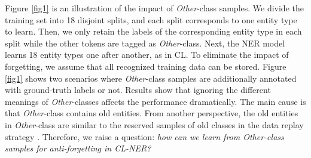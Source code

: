 \documentclass[11pt]{article}
\begin{document}
Figure \ref{fig1} is an illustration of the impact of \textit{Other}-class samples.
We divide the training set into 18 disjoint splits, and each split corresponds to one entity type to learn.
Then, we only retain the labels of the corresponding entity type in each split while the other tokens are tagged as \textit{Other}-class.
Next, the NER model learns 18 entity types one after another, as in CL.
To eliminate the impact of forgetting, we assume that all recognized training data can be stored.
Figure \ref{fig1} shows two scenarios where \textit{Other}-class samples are additionally annotated with ground-truth labels or not.
Results show that ignoring the different meanings of \textit{Other}-classes affects the performance dramatically. 
The main cause is that \textit{Other}-class contains old entities.
From another perspective, the old entities in \textit{Other}-class are similar to the reserved samples of old classes in the data replay strategy \citep{rebuffi2017icarl}.
Therefore, we raise a question: \textit{how can we learn from  \textit{Other}-class samples for anti-forgetting in CL-NER?}
\end{document}
